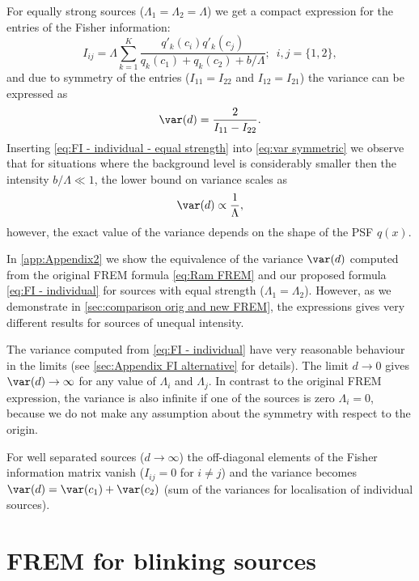 For equally strong sources ($\Lambda_1=\Lambda_2=\Lambda$) we get a compact expression for the entries of the Fisher information: 
%
\begin{equation}
	I_{ij} =\Lambda\sum_{k=1}^{K}\frac{q'_k(c_i)q'_k(c_j)}{q_k(c_1)+q_k(c_2)+b/\Lambda};\; \ i,j=\{1,2\},
	\label{eq:FI - individual - equal strength}
\end{equation}
%
and due to symmetry of the entries ($I_{11}=I_{22}$ and $I_{12}=I_{21}$) the variance can be expressed as
%
\begin{equation}
	\var(d)=\frac{2}{I_{11}-I_{22}}.
	\label{eq:var symmetric}
\end{equation}
%
Inserting \autoref{eq:FI - individual - equal strength} into \autoref{eq:var symmetric} we observe that for situations where the background level is considerably smaller then the intensity $b/\Lambda\ll1$, the lower bound on variance scales as
%
\begin{equation}
	\var(d)\propto\frac{1}{\Lambda}, 
\end{equation}
%
however, the exact value of the variance depends on the shape of the PSF $q(x)$.

In \autoref{app:Appendix2} we show the equivalence of the variance $\var(d)$ computed from the original FREM formula \autoref{eq:Ram FREM} and our proposed formula \autoref{eq:FI - individual} for sources with equal strength ($\Lambda_1=\Lambda_2$). However, as we demonstrate in \autoref{sec:comparison orig and new FREM}, the expressions gives very different results for sources of unequal intensity. 

The variance computed from \autoref{eq:FI - individual} have very reasonable behaviour in the limits (see \autoref{sec:Appendix FI alternative} for details). The limit $d\rightarrow0$ gives $\var(d)\rightarrow\infty$ for any value of $\Lambda_i$ and $\Lambda_j$. In contrast to the original FREM expression, the variance is also infinite if one of the sources is zero $\Lambda_i=0$, because we do not make any assumption about the symmetry with respect to the origin. 

For well separated sources ($d\rightarrow\infty$) the off-diagonal elements of the Fisher information matrix vanish ($I_{ij}=0$ for $i\neq j$) and the variance becomes $\var(d)=\var(c_1)+\var(c_2)$ (sum of the variances for localisation of individual sources).



\section{FREM for blinking sources\label{sec:FREM for blinking}}

